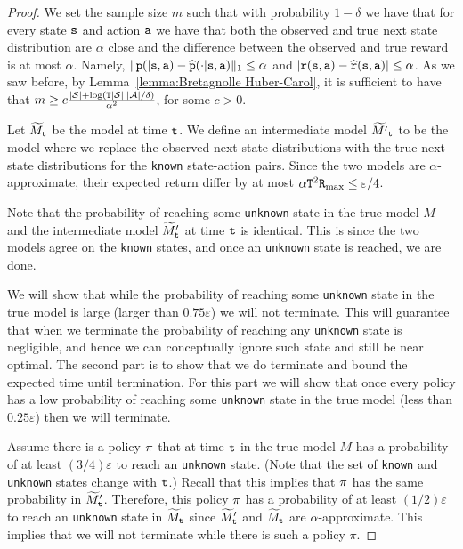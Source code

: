 \begin{proof}
We set the sample size $m$ such that with probability $1-\delta$ we
have that for every state ${\tt s}$ and action ${\tt a}$ we have that
both the observed and true next state distribution are $\alpha$
close and the difference between the observed and true reward is at
most $\alpha$. Namely,
$\|{\tt p}(|{\tt s},{\tt a})-\widehat{{\tt p}}(\cdot|{\tt s},{\tt a})\|_1\leq
\alpha$ and
$|{\tt r}({\tt s},{\tt a})-\widehat{{\tt r}}({\tt s},{\tt a})|\leq
\alpha$.
As we saw before, by Lemma~\ref{lemma:Bretagnolle Huber-Carol}, it is sufficient to have that $m\geq
c\frac{|\mathcal{S}|+\log({\tt T}|\mathcal{S}|\;|\mathcal{A}|/\delta)}{\alpha^2}$, for some $c>0$.

Let $\widetilde{M}_{\tt t}$ be the model at time ${\tt t}$. We define an intermediate model
$\widetilde{M'}_{\tt t}$ to be the model where we replace the observed
next-state distributions with the true next state distributions for the \texttt{known} state-action pairs.
Since the two models are $\alpha$-approximate, their expected return
differ by at most $\alpha{\tt T}^2{\tt R}_{\max }\leq \varepsilon/4$.

Note that the probability of reaching some \texttt{unknown} state in the true model $M$ and the intermediate model
$\widetilde{M}'_{\tt t}$ at time ${\tt t}$ is identical. This is since the
two models agree on the \texttt{known} states, and once an \texttt{unknown} state is
reached, we are done.

We will show that while the probability of reaching some \texttt{unknown} state in the true model is large (larger than $0.75\varepsilon$) we will not terminate. This will guarantee that when we terminate the probability of reaching any \texttt{unknown} state is negligible, and hence we can conceptually ignore such state and still be near optimal. The second part is to show that we do terminate and bound the expected time until termination. For this part we will show that once every policy has a low probability of reaching some \texttt{unknown} state in the true model  (less than $0.25\varepsilon$) then we will terminate. 

Assume there is a policy $\pi$ that at time ${\tt t}$ in the true
model $M$ has a probability of at least $(3/4)\varepsilon$ to reach
an \texttt{unknown} state. (Note that the set of \texttt{known} and \texttt{unknown} states
change with ${\tt t}$.) Recall that this implies that $\pi$ has
the same probability in $\widetilde{M}'_{\tt t}$. Therefore, this policy $\pi$
has a probability of at least $(1/2)\varepsilon$ to reach an \texttt{unknown}
state in $\widetilde{M}_{\tt t}$ since $\widetilde{M}'_{\tt t}$ and
$\widetilde{M}_{\tt t}$ are $\alpha$-approximate. This implies that we will not terminate while there is such a policy $\pi$.


\end{proof}
